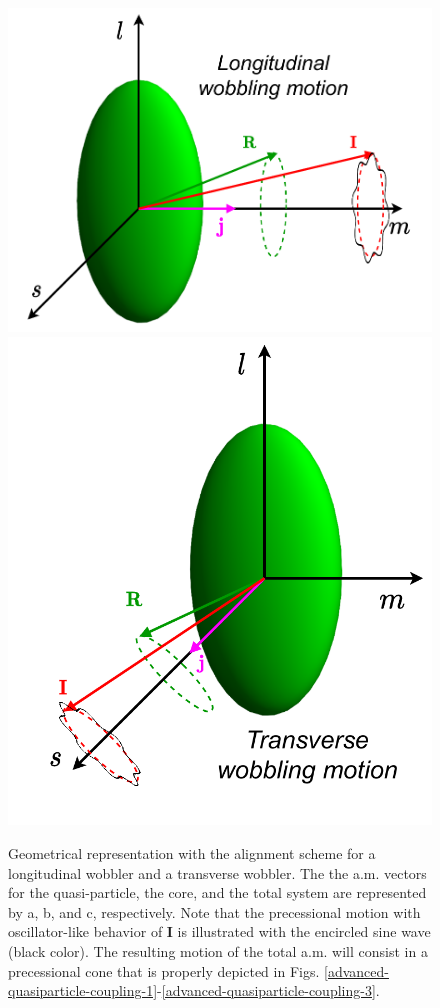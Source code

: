 \begin{figure}
    \centering
    \includegraphics[scale=0.5]{Chapters/Figures/longitudinal_wobbler-schematic.pdf}
    \includegraphics[scale=0.5]{Chapters/Figures/transverse_wobbler-schematic.pdf}
    \caption{Geometrical representation with the alignment scheme for a longitudinal wobbler and a transverse wobbler. The the a.m. vectors for the quasi-particle, the core, and the total system are represented by a, b, and c, respectively. Note that the precessional motion with oscillator-like behavior of $\mathbf{I}$ is illustrated with the encircled sine wave (black color). The resulting motion of the total a.m. will consist in a precessional cone that is properly depicted in Figs. \ref{advanced-quasiparticle-coupling-1}-\ref{advanced-quasiparticle-coupling-3}.}
    \label{wobbling-oddA-geometry}
\end{figure}
